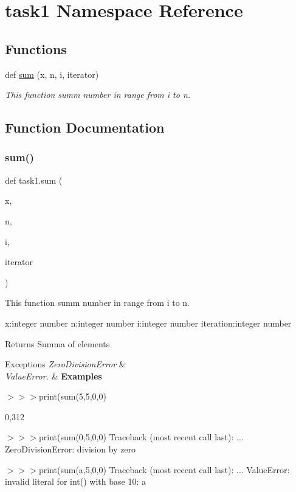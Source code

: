 \hypertarget{namespacetask1}{}\section{task1 Namespace Reference}
\label{namespacetask1}
\subsection*{Functions}
\begin{DoxyCompactItemize}
\item 
def \hyperlink{namespacetask1_af56f33ab4a6cbea7681f04efce2199d9}{sum} (x, n, i, iterator)
\begin{DoxyCompactList}\small\item\em This function summ number in range from i to n. \end{DoxyCompactList}\end{DoxyCompactItemize}


\subsection{Function Documentation}
\mbox{\label{namespacetask1_af56f33ab4a6cbea7681f04efce2199d9}} 
\subsubsection{\texorpdfstring{sum()}{sum()}}
{\footnotesize\ttfamily def task1.\+sum (\begin{DoxyParamCaption}\item[{}]{x,  }\item[{}]{n,  }\item[{}]{i,  }\item[{}]{iterator }\end{DoxyParamCaption})}



This function summ number in range from i to n. 

x\+:integer number n\+:integer number i\+:integer number iteration\+:integer number

\begin{DoxyReturn}{Returns}
Summa of elements
\end{DoxyReturn}

\begin{DoxyExceptions}{Exceptions}
{\em Zero\+Division\+Error} & \\
\hline
{\em Value\+Error.} & {\bfseries Examples} 
\begin{DoxyCode}
\end{DoxyCode}
 $>$$>$$>$print(sum(5,5,0,0) 
\begin{DoxyCode}
0,312
\end{DoxyCode}
 $>$$>$$>$print(sum(0,5,0,0) Traceback (most recent call last)\+: ... Zero\+Division\+Error\+: division by zero\\
\hline
\end{DoxyExceptions}
$>$$>$$>$print(sum(a,5,0,0) Traceback (most recent call last)\+: ... Value\+Error\+: invalid literal for int() with base 10\+: \textquotesingle{}a\textquotesingle{}  